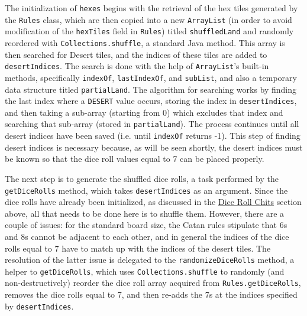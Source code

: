 \documentclass[pageno]{jpaper}
\begin{document}
\begin{doublespacing}
The initialization of \lstinline$hexes$ begins with the retrieval of the hex tiles generated by the \lstinline$Rules$ class, which are then copied into a new \lstinline$ArrayList$ (in order to avoid modification of the \lstinline$hexTiles$ field in \lstinline$Rules$) titled \lstinline$shuffledLand$ and randomly reordered with \lstinline$Collections.shuffle$, a standard Java method. This array is then searched for Desert tiles, and the indices of these tiles are added to \lstinline$desertIndices$. The search is done with the help of \lstinline$ArrayList$'s built-in methods, specifically \lstinline$indexOf$, \lstinline$lastIndexOf$, and \lstinline$subList$, and also a temporary data structure titled \lstinline$partialLand$. The algorithm for searching works by finding the last index where a \lstinline$DESERT$ value occurs, storing the index in \lstinline$desertIndices$, and then taking a sub-array (starting from 0) which excludes that index and searching that sub-array (stored in \lstinline$partialLand$). The process continues until all desert indices have been saved (i.e. until \lstinline$indexOf$ returns -1). This step of finding desert indices is necessary because, as will be seen shortly, the desert indices must be known so that the dice roll values equal to 7 can be placed properly. 

The next step is to generate the shuffled dice rolls, a task performed by the \lstinline$getDiceRolls$ method, which takes \lstinline$desertIndices$ as an argument. Since the dice rolls have already been initialized, as discussed in the \hyperlink{sec:dice_roll_chits}{Dice Roll Chits} section above, all that needs to be done here is to shuffle them. However, there are a couple of issues: for the standard board size, the Catan rules stipulate that 6s and 8s cannot be adjacent to each other, and in general the indices of the dice rolls equal to 7 have to match up with the indices of the desert tiles. The resolution of the latter issue is delegated to the \lstinline$randomizeDiceRolls$ method, a helper to \lstinline$getDiceRolls$, which uses \lstinline$Collections.shuffle$ to randomly (and non-destructively) reorder the dice roll array acquired from \lstinline$Rules.getDiceRolls$, removes the dice rolls equal to 7, and then re-adds the 7s at the indices specified by \lstinline$desertIndices$. 


\end{doublespacing}
\end{document}
